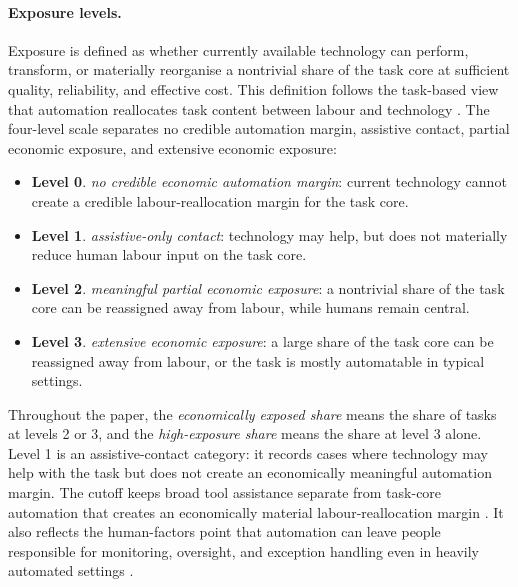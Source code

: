 \documentclass[11pt]{article}
\begin{document}
\paragraph{Exposure levels.} Exposure is defined as whether currently available technology can perform, transform, or materially reorganise a nontrivial share of the task core at sufficient quality, reliability, and effective cost. This definition follows the task-based view that automation reallocates task content between labour and technology \citep{AutorLevyMurnane2003,AcemogluRestrepo2018}. The four-level scale separates no credible automation margin, assistive contact, partial economic exposure, and extensive economic exposure:
\begin{itemize}[leftmargin=*,itemsep=0.1em,topsep=0.3em]
    \item \textbf{Level 0}. \textit{no credible economic automation margin}: current technology cannot create a credible labour-reallocation margin for the task core.
    \item \textbf{Level 1}. \textit{assistive-only contact}: technology may help, but does not materially reduce human labour input on the task core.
    \item \textbf{Level 2}. \textit{meaningful partial economic exposure}: a nontrivial share of the task core can be reassigned away from labour, while humans remain central.
    \item \textbf{Level 3}. \textit{extensive economic exposure}: a large share of the task core can be reassigned away from labour, or the task is mostly automatable in typical settings.
\end{itemize}
Throughout the paper, the \textit{economically exposed share} means the share of tasks at levels 2 or 3, and the \textit{high-exposure share} means the share at level 3 alone. Level 1 is an assistive-contact category: it records cases where technology may help with the task but does not create an economically meaningful automation margin. The cutoff keeps broad tool assistance separate from task-core automation that creates an economically material labour-reallocation margin \citep{AutorLevyMurnane2003,AcemogluRestrepo2018}. It also reflects the human-factors point that automation can leave people responsible for monitoring, oversight, and exception handling even in heavily automated settings \citep{Bainbridge1983,Endsley2017}.
\end{document}

